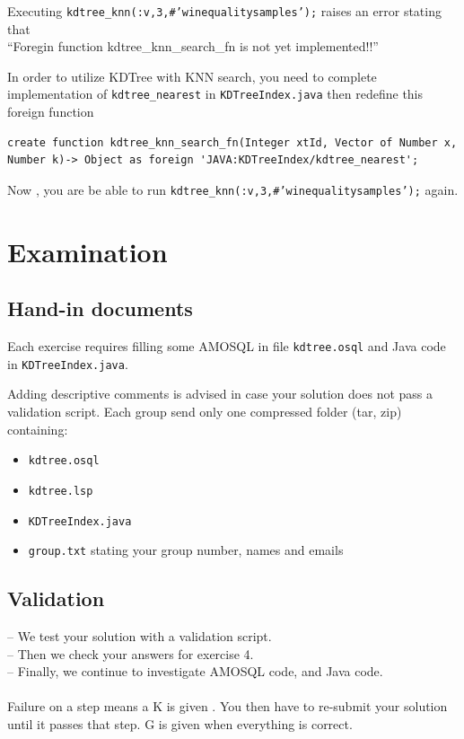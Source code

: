 \documentclass[12pt]{article}
\begin{document}
\begin{enumerate}
Executing \texttt{kdtree\_knn(:v,3,\#'winequalitysamples');} raises an
error stating that\\ ``Foregin function kdtree\_knn\_search\_fn is not
yet implemented!!''

In order to utilize KDTree with KNN search, you need to complete
implementation of \texttt{kdtree\_nearest} in
\texttt{KDTreeIndex.java} then redefine this foreign function
\begin{lstlisting}[caption={Foreign function kdtree\_knn\_search\_fn},label={lst:defamosqlknn}]
   create function kdtree_knn_search_fn(Integer xtId, Vector of Number x, Number k)-> Object as foreign 'JAVA:KDTreeIndex/kdtree_nearest';
\end{lstlisting}
Now , you are be able to run \texttt{kdtree\_knn(:v,3,\#'winequalitysamples');} again.
\end{enumerate}
\section{Examination}
\subsection{Hand-in documents} \label{handin}
Each exercise requires filling some AMOSQL in file
\texttt{kdtree.osql} and Java code in \texttt{KDTreeIndex.java}.

Adding descriptive comments is advised in case your solution does not
pass a validation script. Each group send only one compressed folder
(tar, zip) containing:
\begin{itemize}
\item \texttt{kdtree.osql}
\item \texttt{kdtree.lsp}
\item \texttt{KDTreeIndex.java}
\item \texttt{group.txt} stating your group number, names and emails
\end{itemize}
\subsection{Validation} \label{validation}
-- We test your solution with a validation script.\\
-- Then we check your answers for exercise 4.\\
-- Finally, we continue to investigate AMOSQL code, and Java code.\\\\
Failure on a step means a K is given . You then have to re-submit your solution until it passes that step. G is given when everything is correct.\\
\end{document}
